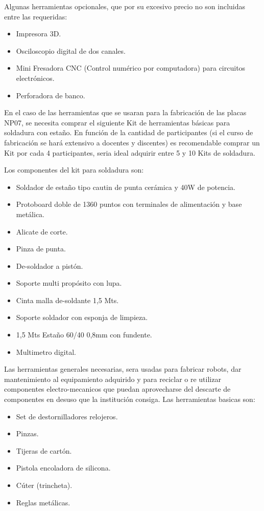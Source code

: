 Algunas herramientas opcionales, que por su excesivo precio no son incluidas entre las requeridas:

\begin{itemize}
  \item Impresora 3D.
  \item Osciloscopio digital de dos canales.
  \item Mini Fresadora CNC (Control numérico por computadora) para circuitos electrónicos.
  \item Perforadora de banco. 
\end{itemize}

En el caso de las herramientas que se usaran para la fabricación de las placas NP07, se necesita comprar el siguiente Kit de herramientas básicas para soldadura con estaño. En función de la cantidad de participantes (si el curso de fabricación se hará extensivo a docentes y discentes) es recomendable comprar un Kit por cada 4 participantes, seria ideal adquirir entre 5 y 10 Kits de soldadura.

Los componentes del kit para soldadura son:

\begin{itemize}
  \item Soldador de estaño tipo cautin de punta cerámica y 40W de potencia.
  \item Protoboard doble de 1360 puntos con terminales de alimentación y base metálica.
  \item Alicate de corte.
  \item Pinza de punta.
  \item De-soldador a pistón.
  \item Soporte multi propósito con lupa.
  \item Cinta malla de-soldante 1,5 Mts.
  \item Soporte soldador con esponja de limpieza.
  \item 1,5 Mts Estaño 60/40 0,8mm con fundente.
  \item Multimetro digital.
\end{itemize}

Las herramientas generales necesarias, sera usadas para fabricar robots, dar mantenimiento al equipamiento adquirido y para reciclar o re utilizar componentes electro-mecanicos que puedan aprovecharse del descarte de componentes en desuso que la institución consiga. Las herramientas basicas son:

  \begin{itemize}
    \item Set de destornilladores relojeros.
    \item Pinzas.
    \item Tijeras de cartón.
    \item Pistola encoladora de silicona.
    \item Cúter (trincheta).
    \item Reglas metálicas.
  \end{itemize}
  
